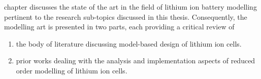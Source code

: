 
 chapter  discusses the  state of  the art  in the  field of
lithium ion battery modelling pertinent  to the research sub-topics discussed in
this thesis.  Consequently, the modelling  art is  presented in two  parts, each
providing a critical review of
\begin{enumerate}[topsep=0pt, before={\vspace*{-0.25\baselineskip}}]
    \item the body of literature discussing model-based design of lithium ion cells.
    \item prior works dealing with the analysis and implementation aspects
        of reduced order modelling of lithium ion cells.
\end{enumerate}

